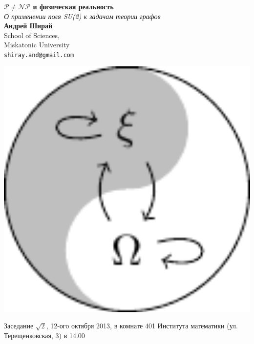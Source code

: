 \documentclass[a0,portrait]{a0poster}
\begin{document}


\begin{minipage}[b]{0.75\linewidth}
\veryHuge \color{NavyBlue} \textbf{$\mathcal{P}\neq\mathcal{NP}$ и физическая реальность} \color{Black}\\ 
\Huge\textit{О применении поля SU(2) к задачам теории графов}\\[2cm] %
\huge \textbf{Андрей Ширай}\\[0.5cm] %
\huge School of Sciences,\\
   Miskatonic University\\[0.4cm] %
\Large \texttt{shiray.and@gmail.com} \\
\end{minipage}
%
\begin{minipage}[b]{0.25\linewidth}
\includegraphics[width=20cm]{../ccs_logo.pdf}\\
\end{minipage}
Заседание \textnumero $\sqrt{2}$, 12-ого октября 2013, в комнате 401 Института математики (ул. Терещенковская, 3)  в 14.00
\vspace{1cm} %
\end{document}
